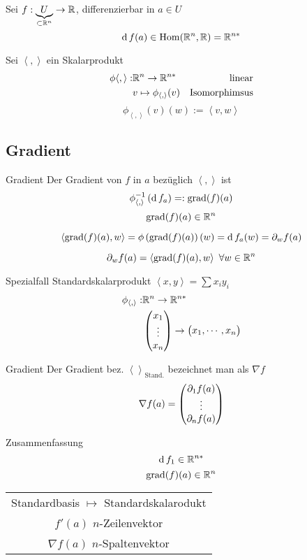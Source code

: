 \begin{Bem}
  Sei $f:\underbrace{U}_{\subset\mathbb{R}^n}\to \mathbb{R}$, differenzierbar in $a\in U$
  \[\operatorname{d} f(a)\in\operatorname{Hom}(\mathbb{R}^n,\mathbb{R})=\mathbb{R}^{n*}\]
\end{Bem}
\begin{Bem}
  Sei $\left\langle , \right\rangle$ ein Skalarprodukt
  \begin{align*}
    \phi{\left\langle , \right\rangle}:&\mathbb{R}^n\to\mathbb{R}^{n*}&\text{linear}\\
    &v\mapsto\phi_{\left\langle , \right\rangle}(v)&\text{Isomorphimsus}
  \end{align*}
  \[\phi_{\left\langle , \right\rangle}(v)(w):=\left\langle v,w \right\rangle \]
\end{Bem}
\subsection{Gradient}
\begin{Def}{Gradient}
  Der Gradient von $f$ in $a$ bezüglich $\left\langle , \right\rangle$ ist
  \[\phi_{\left\langle , \right\rangle}^{-1}\left( \operatorname{d} f_a \right)=:\operatorname{grad}(f)(a)\]
  \[\operatorname{grad}(f)(a)\in\mathbb{R}^n\]
\end{Def}
\begin{Bem}
  \[\left\langle \operatorname{grad}(f)(a),w \right\rangle =\phi\left( \operatorname{grad}(f)(a) \right)(w)=\operatorname{d} f_a(w)=\partial_wf(a)\]
\end{Bem}
\begin{Bem}
  \[\partial_wf(a)=\left\langle \operatorname{grad}(f)(a),w \right\rangle \ \forall w\in\mathbb{R}^n\]
\end{Bem}
\begin{Bem}{Spezialfall Standardskalarprodukt}
  $\left\langle x,y \right\rangle =\sum x_iy_i$
  \begin{align*}
    \phi_{\left\langle , \right\rangle}:&\mathbb{R}^n\to\mathbb{R}^{n*}\\
    &\begin{pmatrix}x_1\\\vdots\\x_n\end{pmatrix}\to\begin{pmatrix}x_1,\cdots,x_n\end{pmatrix}
  \end{align*}
\end{Bem}
\begin{Not}{Gradient}
  Der Gradient bez. $\left\langle  \right\rangle_\text{Stand.}$ bezeichnet man als $\nabla f$
  \[\nabla f(a)=\begin{pmatrix}\partial_1 f(a)\\\vdots\\\partial_n f(a)\end{pmatrix}\]
\end{Not}
\begin{Bem}{Zusammenfassung}
  \[\operatorname{d} f_1\in\mathbb{R}^{n*}\]
  \[\operatorname{grad}(f)(a)\in\mathbb{R}^n\]
  \begin{tabular}[htb]{c}
  Standardbasis $\mapsto$ Standardskalarodukt\\
  $f'(a)$ $n$-Zeilenvektor\\
  $\nabla f(a)$ $n$-Spaltenvektor
  \end{tabular}
\end{Bem}
